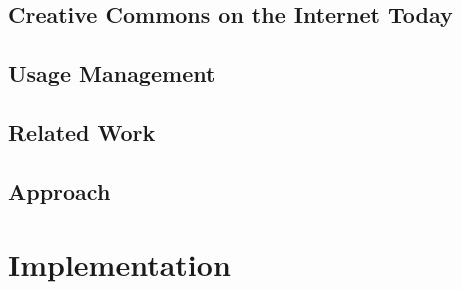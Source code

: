\documentclass[botnum,fleqn,final]{unmeethesis}
\begin{document}
\section{\label{section:intro:cconi}Creative Commons on the Internet Today}

\section{\label{section:intro:um}Usage Management}

\section{\label{section:intro:rw}Related Work}

\section{\label{section:intro:approach}Approach}

\chapter{\label{chapter:impl}Implementation}
\end{document}
